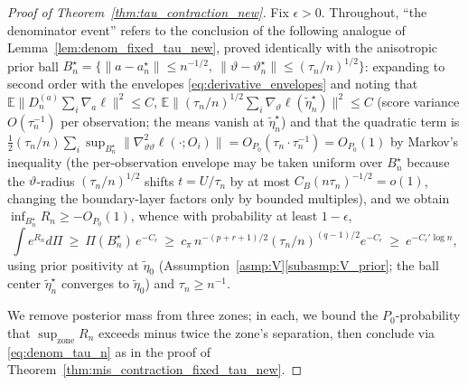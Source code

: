 \documentclass[11pt]{article}
\theoremstyle{definition}
\theoremstyle{plain}
\newcommand{\E}{\mathbb{E}}
\begin{document}
\begin{proof}[Proof of Theorem~\ref{thm:tau_contraction_new}]
Fix $\epsilon>0$. Throughout, ``the denominator event'' refers to the conclusion of the following analogue of Lemma~\ref{lem:denom_fixed_tau_new}, proved identically with the anisotropic prior ball
$B_n^\star=\{\|a-a_n^\star\|\le n^{-1/2},\ \|\vartheta-\vartheta_n^\star\|\le(\tau_n/n)^{1/2}\}$:
expanding to second order with the envelopes \eqref{eq:derivative_envelopes} and noting that
$\E\|D_n^{(a)}\!\sum_i\nabla_a\ell\|^2\le C$, $\E\|(\tau_n/n)^{1/2}\sum_i\nabla_\vartheta\ell(\tilde\eta_n^\star)\|^2\le C$ (score variance $O(\tau_n^{-1})$ per observation; the means vanish at $\tilde\eta_n^\star$) and that the quadratic term is $\tfrac12(\tau_n/n)\sum_i\sup_{B_n^\star}\|\nabla^2_{\vartheta\vartheta}\ell(\cdot;O_i)\|=O_{P_0}(\tau_n\cdot\tau_n^{-1})=O_{P_0}(1)$ by Markov's inequality (the per-observation envelope may be taken uniform over $B_n^\star$ because the $\vartheta$-radius $(\tau_n/n)^{1/2}$ shifts $t=U/\tau_n$ by at most $C_B(n\tau_n)^{-1/2}=o(1)$, changing the boundary-layer factors only by bounded multiples), and we obtain $\inf_{B_n^\star}R_n\ge-O_{P_0}(1)$, whence with probability at least $1-\epsilon$,
\begin{equation}
\int e^{R_n}d\Pi\ \ge\ \Pi(B_n^\star)\,e^{-C_\epsilon}\ \ge\ c_\pi\,n^{-(p+r+1)/2}(\tau_n/n)^{(q-1)/2}e^{-C_\epsilon}
\ \ge\ e^{-C_\epsilon'\log n},
\label{eq:denom_tau_n}
\end{equation}
using prior positivity at $\tilde\eta_0$ (Assumption~\ref{asmp:V}\ref{subasmp:V_prior}; the ball center $\tilde\eta_n^\star$ converges to $\tilde\eta_0$) and $\tau_n\ge n^{-1}$.

We remove posterior mass from three zones; in each, we bound the $P_0$-probability that $\sup_{\text{zone}}R_n$ exceeds minus twice the zone's separation, then conclude via \eqref{eq:denom_tau_n} as in the proof of Theorem~\ref{thm:mis_contraction_fixed_tau_new}.


\end{proof}
\end{document}

